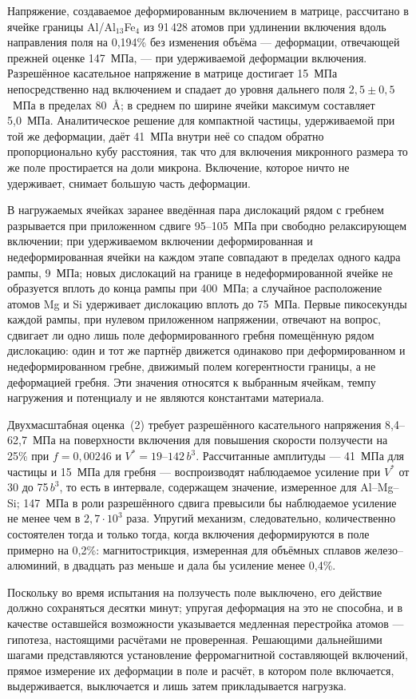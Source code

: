 Напряжение, создаваемое деформированным включением в матрице, рассчитано в
ячейке границы Al/Al$_{13}$Fe$_4$ из 91\,428 атомов при удлинении включения
вдоль направления поля на 0{,}194\% без изменения объёма --- деформации,
отвечающей прежней оценке 147~МПа, --- при удерживаемой деформации
включения. Разрешённое касательное напряжение в матрице достигает
15~МПа непосредственно над включением и спадает до уровня
дальнего поля $2{,}5\pm0{,}5$~МПа в пределах 80~\AA{}; в среднем по ширине
ячейки максимум составляет 5{,}0~МПа. Аналитическое решение
для компактной частицы, удерживаемой при той же деформации, даёт 41~МПа
внутри неё со спадом обратно пропорционально кубу расстояния, так что для
включения микронного размера то же поле простирается на доли микрона.
Включение, которое ничто не удерживает, снимает большую часть деформации.

В нагружаемых ячейках заранее введённая пара дислокаций рядом с гребнем
разрывается при приложенном сдвиге 95--105~МПа при свободно релаксирующем включении; при удерживаемом включении деформированная и недеформированная ячейки на каждом этапе совпадают в пределах одного кадра рампы, 9~МПа; новых дислокаций на границе в недеформированной ячейке не образуется вплоть до конца рампы при 400~МПа; а случайное
расположение атомов Mg и Si удерживает дислокацию вплоть до 75~МПа.
Первые пикосекунды каждой рампы, при нулевом приложенном напряжении, отвечают на вопрос, сдвигает ли одно лишь поле деформированного гребня помещённую рядом дислокацию: один и тот же партнёр движется одинаково при деформированном и недеформированном гребне, движимый полем когерентности границы, а не деформацией гребня. Эти значения относятся к выбранным ячейкам, темпу нагружения и
потенциалу и не являются константами материала.

Двухмасштабная оценка~(2) требует разрешённого касательного напряжения
8{,}4--62{,}7~МПа на поверхности включения для повышения скорости
ползучести на 25\% при $f = 0{,}00246$ и $V^{*} = 19$--$142\,b^{3}$.
Рассчитанные амплитуды --- 41~МПа для частицы и 15~МПа для
гребня --- воспроизводят наблюдаемое усиление при $V^{*}$ от 30 до
75$\,b^{3}$, то есть в интервале, содержащем значение, измеренное для
Al--Mg--Si; 147~МПа в роли разрешённого сдвига превысили бы наблюдаемое
усиление не менее чем в $2{,}7\cdot10^{3}$ раза. Упругий механизм,
следовательно, количественно состоятелен тогда и только тогда, когда
включения деформируются в поле примерно на 0{,}2\%: магнитострикция,
измеренная для объёмных сплавов железо--алюминий, в двадцать раз меньше и
дала бы усиление менее 0{,}4\%.

Поскольку во время испытания на ползучесть поле выключено, его действие
должно сохраняться десятки минут; упругая деформация на это не способна, и в
качестве оставшейся возможности указывается медленная перестройка атомов ---
гипотеза, настоящими расчётами не проверенная. Решающими дальнейшими шагами
представляются установление ферромагнитной составляющей включений, прямое
измерение их деформации в поле и расчёт, в котором поле включается,
выдерживается, выключается и лишь затем прикладывается нагрузка.
